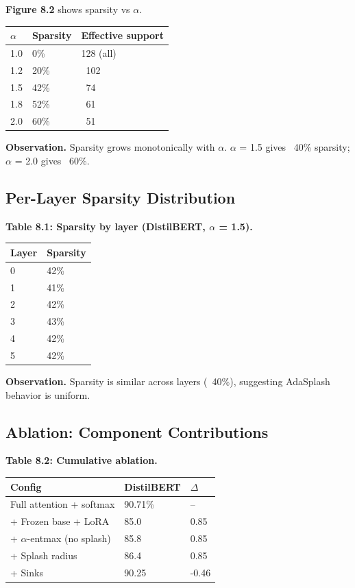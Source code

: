 \textbf{Figure 8.2} shows sparsity vs $\alpha$.

\begin{table}[H]
\centering
\small
\begin{tabular}{lll}
\toprule
\textbf{$\alpha$} & \textbf{Sparsity} & \textbf{Effective support} \\
\midrule
1.0 & 0\% & 128 (all) \\
1.2 & 20\% & ~102 \\
1.5 & 42\% & ~74 \\
1.8 & 52\% & ~61 \\
2.0 & 60\% & ~51 \\
\bottomrule
\end{tabular}
\end{table}

\textbf{Observation.} Sparsity grows monotonically with $\alpha$. $\alpha$ = 1.5 gives ~40\% 
sparsity; $\alpha$ = 2.0 gives ~60\%.

\subsection{Per-Layer Sparsity Distribution}

\textbf{Table 8.1: Sparsity by layer (DistilBERT, $\alpha$ = 1.5).}

\begin{table}[H]
\centering
\small
\begin{tabular}{ll}
\toprule
\textbf{Layer} & \textbf{Sparsity} \\
\midrule
0 & 42\% \\
1 & 41\% \\
2 & 42\% \\
3 & 43\% \\
4 & 42\% \\
5 & 42\% \\
\bottomrule
\end{tabular}
\end{table}

\textbf{Observation.} Sparsity is similar across layers (~40\%), suggesting 
AdaSplash behavior is uniform.

\subsection{Ablation: Component Contributions}

\textbf{Table 8.2: Cumulative ablation.}

\begin{table}[H]
\centering
\small
\begin{tabular}{lll}
\toprule
\textbf{Config} & \textbf{DistilBERT} & \textbf{$\Delta$} \\
\midrule
Full attention + softmax & 90.71\% & -- \\
+ Frozen base + LoRA & 85.0 & 0.85 \\
+ $\alpha$-entmax (no splash) & 85.8 & 0.85 \\
+ Splash radius & 86.4 & 0.85 \\
+ Sinks & 90.25 & -0.46 \\
\bottomrule
\end{tabular}
\end{table}

